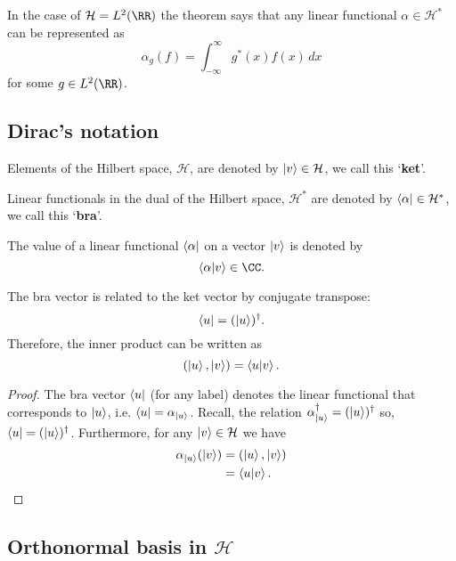 \documentclass[12pt, a4paper]{article}
\begin{document}
\begin{example}
    In the case of \(\mathcal{H}=L^2(\RR)\) the theorem says that any linear functional \(\alpha \in \mathcal{H}^*\) can be represented as 
    \[\alpha_g(f) = \int_{-\infty}^{\infty} g^*(x) f(x) \, dx\]
    for some \(g \in L^2(\RR)\).
\end{example}

\subsection{Dirac's notation}

\begin{definition}
    Elements of the Hilbert space, \(\mathcal{H}\), are denoted by \(\ket{v} \in \mathcal{H}\), we call this `\textbf{ket}'.
\end{definition}

\begin{definition}
    Linear functionals in the dual of the Hilbert space, \(\mathcal{H}^*\) are denoted by \(\bra{\alpha} \in \mathcal{H}^*\), we call this `\textbf{bra}'.
\end{definition}

\begin{theorem}
    The value of a linear functional \(\bra{\alpha}\) on a vector \(\ket{v}\) is denoted by 
    \[\bra{\alpha} \ket{v} \in \CC.\]
\end{theorem}

\begin{mdthm}
    The bra vector is related to the ket vector by conjugate transpose:
    \[\bra{u} = (\ket{u})^{\dagger}.\]
    Therefore, the inner product can be written as
    \[(\ket{u},\ket{v}) = \bra{u} \ket{v}.\]
\end{mdthm}

\begin{proof}
    The bra vector \(\bra{u}\) (for any label) denotes the linear functional that corresponds to \(\ket{u}\), i.e. \(\bra{u} = \alpha_{\ket{u}}\). Recall, the relation \(\alpha_{\ket{u}}^{\dagger} = (\ket{u})^{\dagger}\) so, \(\bra{u} = (\ket{u})^{\dagger}\). Furthermore, for any \(\ket{v} \in \mathcal{H}\) we have 
    \[\begin{aligned}
        \alpha_{\ket{u}}(\ket{v}) &= (\ket{u},\ket{v}) \\
        &= \bra{u}\ket{v}.
    \end{aligned}\]
\end{proof}

\subsection{Orthonormal basis in \texorpdfstring{\(\mathcal{H}\)}{TEXT}}
\end{document}

